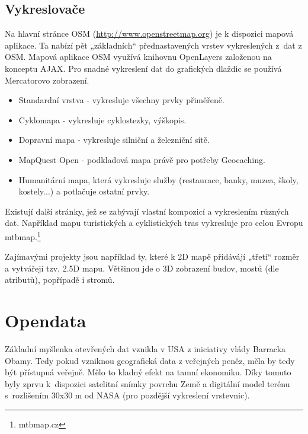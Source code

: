 \subsection{Vykreslovače}
\label{Vykreslovače}
Na hlavní stránce OSM (\url{http://www.openstreetmap.org}) je k dispozici mapová aplikace. Ta nabízí pět
„základních“ přednastavených vrstev vykreslených z~dat z OSM. Mapová
aplikace OSM využívá knihovnu OpenLayers založenou na konceptu AJAX.
Pro snadné vykreslení dat do grafických dlaždic se používá Mercatorovo
zobrazení.

\begin{itemize}

  \item Standardní vrstva - vykresluje všechny prvky přiměřeně.
  \item Cyklomapa - vykresluje cyklostezky, výškopis. 
  \item Dopravní mapa - vykresluje silniční a železniční sítě.
  \item MapQuest Open - podkladová mapa právě pro potřeby 
    Geocaching.
  \item Humanitární mapa, která vykresluje služby (restaurace, banky, muzea, 
  školy, kostely...)  a potlačuje ostatní prvky. 

\end{itemize}

Existují další stránky, jež se zabývají vlastní kompozicí a vykreslením
různých dat. Například mapu turistických a cyklistických tras vykresluje
pro celou Evropu mtbmap.\footnote{mtbmap.cz}

Zajímavými projekty jsou například ty, které k 2D mapě přidávájí „třetí“ rozměr a
vytvářejí tzv. 2.5D mapu. Většinou jde o 3D zobrazení budov, mostů (dle
atributů), popřípadě i stromů.

\section{Opendata}
\label{opendata}

Základní myšlenka otevřených dat vznikla v USA z iniciativy vlády Barracka Obamy.
Tedy pokud vzniknou geografická data z veřejných peněz, měla by tedy být
přístupná veřejně. Mělo to kladný efekt na tamní ekonomiku. Díky tomuto byly
zprvu k~dispozici satelitní snímky povrchu Země a digitální model terénu
s~rozlišením 30x30 m od NASA (pro pozdější vykreslení vrstevnic).

